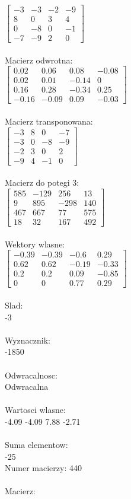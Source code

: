 \documentclass[a4paper,12pt]{article}
\begin{document}
$\begin{bmatrix} -3&-3&-2&-9\\8&0&3&4\\0&-8&0&-1\\-7&-9&2&0 \end{bmatrix}$
\\
\\
Macierz odwrotna:\\

$\begin{bmatrix} 0.02&0.06&0.08&-0.08\\0.02&0.01&-0.14&0\\0.16&0.28&-0.34&0.25\\-0.16&-0.09&0.09&-0.03 \end{bmatrix}$
\\
\\
Macierz transponowana:\\

$\begin{bmatrix} -3&8&0&-7\\-3&0&-8&-9\\-2&3&0&2\\-9&4&-1&0 \end{bmatrix}$
\\
\\
Macierz do potegi 3:\\

$\begin{bmatrix} 585&-129&256&13\\9&895&-298&140\\467&667&77&575\\18&32&167&492 \end{bmatrix}$
\\
\\
Wektory wlasne:\\

$\begin{bmatrix} -0.39&-0.39&-0.6&0.29\\0.62&0.62&-0.19&-0.33\\0.2&0.2&0.09&-0.85\\0&0&0.77&0.29 \end{bmatrix}$
\\
\\
Slad:\\
-3
\\
\\
Wyznacznik:\\
-1850
\\
\\
Odwracalnosc:\\
Odwracalna
\\
\\
Wartosci wlasne:\\
-4.09 -4.09 7.88 -2.71
\\
\\
Suma elementow:\\
-25
\\
\newpage
Numer macierzy:
440
\\
\\
Macierz:\\
\end{document}
